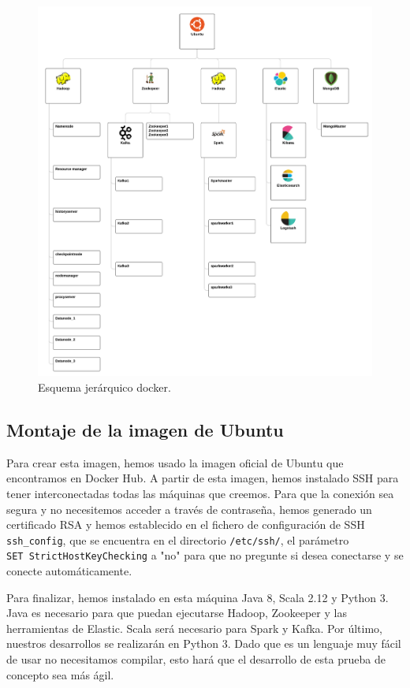\begin{figure}[htp]
\centering
\includegraphics[scale=0.20]{Imagenes/arqProp2.png}
\caption{Esquema jerárquico docker.}
\label{lmdarq2}
\end{figure}

\subsection{Montaje de la imagen de Ubuntu\label{montUbuntu}}

Para crear esta imagen, hemos usado la imagen oficial de Ubuntu que
encontramos en Docker Hub. A partir de esta imagen, hemos instalado SSH
para tener interconectadas todas las máquinas que creemos. Para que la
conexión sea segura y no necesitemos acceder a través de contraseña, hemos
generado un certificado RSA y hemos establecido en el fichero de
configuración de SSH {\tt ssh\_config}, que se encuentra en el directorio
{\tt /etc/ssh/}, el parámetro {\tt SET~StrictHostKeyChecking} a "no" para
que no pregunte si desea conectarse y se conecte automáticamente.

Para finalizar, hemos instalado en esta máquina Java 8, Scala 2.12 y Python
3. Java es necesario para que puedan ejecutarse Hadoop, Zookeeper y las
herramientas de Elastic. Scala será necesario para Spark y Kafka. Por
último, nuestros desarrollos se realizarán en Python 3. Dado que es un
lenguaje muy fácil de usar no necesitamos compilar, esto hará que el
desarrollo de esta prueba de concepto sea más ágil.

